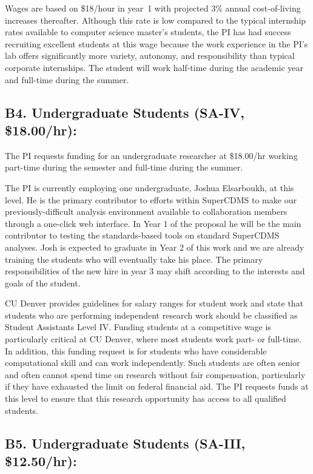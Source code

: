 \documentclass[11pt,oneside]{memoir}
\begin{document}
Wages are based on \$18/hour in year~1 with projected 3\% annual cost-of-living increases thereafter. Although this rate is low compared to the typical internship rates available to computer science master's students, the PI has had success recruiting excellent students at this wage because the work experience in the PI's lab offers significantly more variety, autonomy, and responsibility than typical corporate internships.  The student will work half-time during the academic year and full-time during the summer. 

\subsection{B4. Undergraduate Students (SA-IV, \$18.00/hr):}

The PI requests funding for an undergraduate researcher at \$18.00/hr working part-time during the semester and full-time during the summer.  

The PI is currently employing one undergraduate, Joshua Elsarboukh, at this level. He is the primary contributor to efforts within SuperCDMS to make our previously-difficult analysis environment available to collaboration members through a one-click web interface.  In Year 1 of the proposal he will be the main contributor to testing the standards-based tools on standard SuperCDMS analyses.  Josh is expected to graduate in Year 2 of this work and we are already training the students who will eventually take his place.  The primary responsibilities of the new hire in year 3 may shift according to the interests and goals of the student.

CU Denver provides guidelines for salary ranges for student work and state that students who are performing independent research work should be classified as Student Assistants Level IV.  Funding students at a competitive wage is particularly critical at CU Denver, where most students work part- or full-time.  In addition, this funding request is for students who have considerable computational skill and can work independently.  Such students are often senior and often cannot spend time on research without fair compensation, particularly if they have exhausted the limit on federal financial aid.  The PI requests funds at this level to ensure that this research opportunity has access to all qualified students. 

\subsection{B5. Undergraduate Students (SA-III, \$12.50/hr):}
\end{document}
